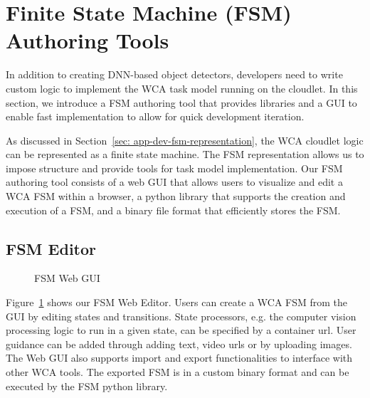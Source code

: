\section{Finite State Machine (FSM) Authoring Tools}
\label{sec: app-dev-fsm}

In addition to creating DNN-based object detectors, developers need to write
custom logic to implement the WCA task model running on the cloudlet. In this
section, we introduce a FSM authoring tool that provides libraries and a GUI to
enable fast implementation to allow for quick development iteration.

As discussed in Section~\ref{sec: app-dev-fsm-representation}, the WCA cloudlet
logic can be represented as a finite state machine. The FSM representation
allows us to impose structure and provide tools for task model implementation.
Our FSM authoring tool consists of a web GUI that allows users to visualize and
edit a WCA FSM within a browser, a python library that supports the creation and
execution of a FSM, and a binary file format that efficiently stores the FSM.

\subsection{FSM Editor}

\begin{figure}
    \centering
	\caption{FSM Web GUI}
    \label{figs:fsm-web-gui}
\end{figure}

Figure~\ref{figs:fsm-web-gui} shows our FSM Web Editor. Users can create a WCA
FSM from the GUI by editing states and transitions. State processors, e.g. the
computer vision processing logic to run in a given state, can be specified by a
container url. User guidance can be added through adding text, video urls or by
uploading images. The Web GUI also supports import and export functionalities to
interface with other WCA tools. The exported FSM is in a custom binary format
and can be executed by the FSM python library.

